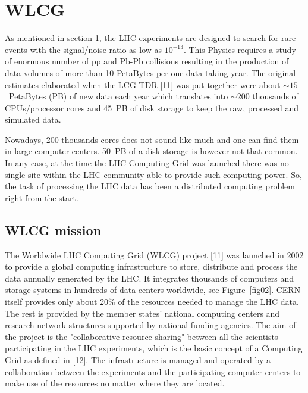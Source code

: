 \section{WLCG}

As mentioned in section 1, the LHC experiments are designed to
search for rare events with the signal/noise ratio as low
as $10^{-13}$. This Physics requires a study of enormous number of
pp and Pb-Pb collisions resulting in the production of data volumes
of more than 10 PetaBytes per one data taking year. The original
estimates elaborated when the LCG TDR [11] was put together were
about $\sim 15$~PetaBytes (PB) of new data each year which
translates into $\sim 200$ thousands of CPUs/processor cores and
45~PB of disk storage to keep the raw, processed and simulated data.

Nowadays, 200 thousands cores does not sound like much and one can
find them in large computer centers. 50~PB of a disk storage is
however not that common. In any case, at the time the LHC Computing
Grid was launched there was no single site within the LHC community
able to provide such computing power. So, the task of
processing the LHC data has been a distributed computing problem
right from the start.

\subsection{WLCG mission}
%
The Worldwide LHC Computing Grid (WLCG) project [11] was launched in
2002 to provide a global computing infrastructure to store,
distribute and process the data annually generated by the LHC.
It integrates thousands of computers and storage systems
in hundreds of data centers worldwide, see Figure~\ref{fig02}. CERN
itself provides only about 20\% of the resources needed to manage
the LHC data. The rest is provided by the member states' national
computing centers and research network structures supported by
national funding agencies. The aim of the project is the
"collaborative resource sharing" between all the scientists
participating in the LHC experiments, which is the basic concept of
a Computing Grid as defined in [12]. The infrastructure is managed
and operated by a collaboration between the experiments and the
participating computer centers to make use of the resources no
matter where they are located.

